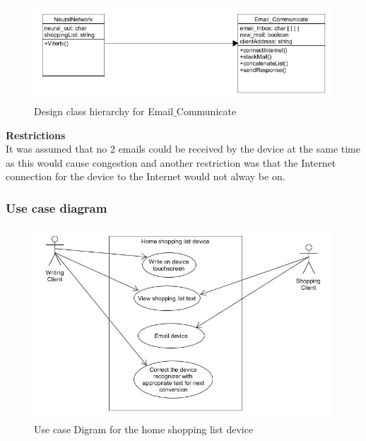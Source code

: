 \begin{figure}[h]
	\centering
	\includegraphics[scale=0.6]{44.jpg}
	\caption{Design class hierarchy for Email$\_$Communicate}
\end{figure}

\textbf{Restrictions}\\
It was assumed that no 2 emails could be received by the device at the same time as this would cause congestion and another restriction was that the Internet connection for the device to the Internet would not alway be on.\\

\subsubsection{Use case diagram}
\begin{figure}[h]
	\centering
	\includegraphics[scale=0.6]{46}
	\caption{Use case Digram for the home shopping list device}
\end{figure}

